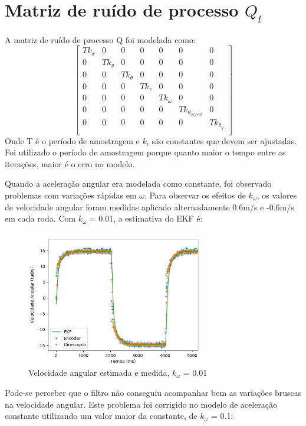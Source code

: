 \documentclass[
	12pt,				%
	openright,			%
	twoside,			%
	convert,
	a4paper,			%
	english,			%
	french,				%
	spanish,			%
	brazil				%
	]{abntex2}
\begin{document}
\section{Matriz de ruído de processo $Q_t$}
A matriz de ruído de processo Q foi modelada como:
\[
\begin{bmatrix}
	Tk_x & 0 & 0 & 0 & 0 & 0 & 0\\
	0 & Tk_y & 0 & 0 & 0 & 0 & 0\\
	0 & 0 & Tk_\theta & 0 & 0 & 0 & 0\\
	0 & 0 & 0 & Tk_v & 0 & 0 & 0\\
	0 & 0 & 0 & 0 & Tk_\omega & 0 & 0\\
	0 & 0 & 0 & 0 & 0 & Tk_{\theta_{offset}} & 0\\
	0 & 0 & 0 & 0 & 0 & 0 & Tk_{\theta_y}\\
\end{bmatrix}
\]
Onde T é o período de amostragem e $k_i $ são constantes que devem ser ajustadas. Foi utilizado o período de amostragem porque quanto maior o tempo entre as iterações, maior é o erro no modelo.
\par
Quando a aceleração angular era modelada como constante, foi observado problemas com variações rápidas em $\omega$. Para observar os efeitos de $k_\omega$, os valores de velocidade angular foram medidas aplicado alternadamente 0.6m/s e -0.6m/s em cada roda. Com $k_\omega$ = 0.01, a estimativa do EKF é:
\begin{figure}[H]
	\caption{Velocidade angular estimada e medida, $k_\omega$ = 0.01}
\begin{center}
   \includegraphics[width=0.7\textwidth]{process_noise_01_2}		
\end{center}
\end{figure}
Pode-se perceber que o filtro não conseguiu acompanhar bem as variações bruscas na velocidade angular. Este problema foi corrigido no modelo de aceleração constante utilizando um valor maior da constante, de $k_\omega$ = 0.1:
\end{document}
